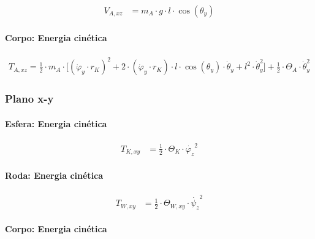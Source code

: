 \begin{equation*}
    \begin{aligned}
        V_{A,xz} & = m_A \cdot g \cdot l \cdot \cos{(\theta_y)}
    \end{aligned}
\end{equation*}

\paragraph{Corpo: Energia cinética}

\begin{equation*}
    \begin{aligned}
        T_{A,xz} = \frac{1}{2} \cdot m_A \cdot \Big[ (\dot{\varphi}_y \cdot r_K)^2 + 2 \cdot (\dot{\varphi}_y \cdot r_K) \cdot l \cdot \cos(\theta_y) \cdot \dot{\theta}_y + l^2 \cdot \dot{\theta}_y^2 \Big] + \frac{1}{2} \cdot \Theta_A \cdot \dot \theta_y^2
    \end{aligned}
\end{equation*}

\subsubsection{Plano x-y}

\paragraph{Esfera: Energia cinética}

\begin{equation*}
    \begin{aligned}
        T_{K,xy} & = \frac{1}{2} \cdot \Theta_K \cdot \dot {\varphi_z}^2 
    \end{aligned}
\end{equation*}

\paragraph{Roda: Energia cinética}

\begin{equation*}
    \begin{aligned}
        T_{W,xy} & = \frac{1}{2} \cdot \Theta_{W,xy} \cdot \dot {\psi_z}^2 
    \end{aligned}
\end{equation*}

\paragraph{Corpo: Energia cinética}

